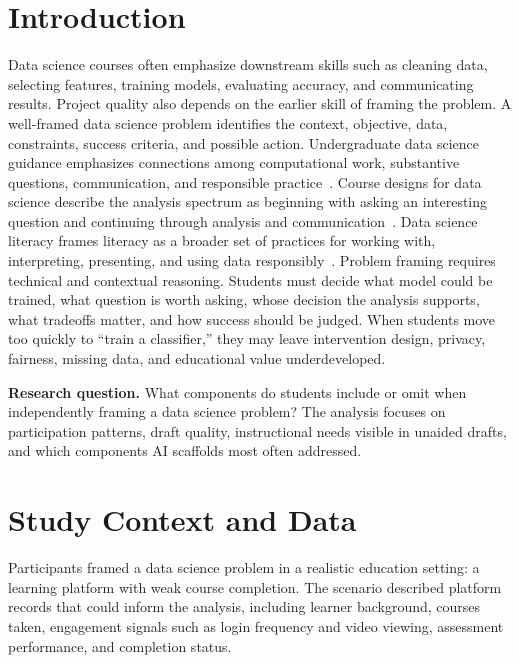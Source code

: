 \documentclass[sigconf,screen,anonymous]{acmart}
\begin{document}
\section{Introduction}
Data science courses often emphasize downstream skills such as cleaning data, selecting features, training models, evaluating accuracy, and communicating results. Project quality also depends on the earlier skill of framing the problem. A well-framed data science problem identifies the context, objective, data, constraints, success criteria, and possible action. Undergraduate data science guidance emphasizes connections among computational work, substantive questions, communication, and responsible practice~\cite{nasem2018data}. Course designs for data science describe the analysis spectrum as beginning with asking an interesting question and continuing through analysis and communication~\cite{baumer2015course}. Data science literacy frames literacy as a broader set of practices for working with, interpreting, presenting, and using data responsibly~\cite{dichev2017data}. Problem framing requires technical and contextual reasoning. Students must decide what model could be trained, what question is worth asking, whose decision the analysis supports, what tradeoffs matter, and how success should be judged. When students move too quickly to ``train a classifier,'' they may leave intervention design, privacy, fairness, missing data, and educational value underdeveloped.

\textbf{Research question.} What components do students include or omit when independently framing a data science problem? The analysis focuses on participation patterns, draft quality, instructional needs visible in unaided drafts, and which components AI scaffolds most often addressed.

\section{Study Context and Data}
Participants framed a data science problem in a realistic education setting: a learning platform with weak course completion. The scenario described platform records that could inform the analysis, including learner background, courses taken, engagement signals such as login frequency and video viewing, assessment performance, and completion status.
\end{document}
